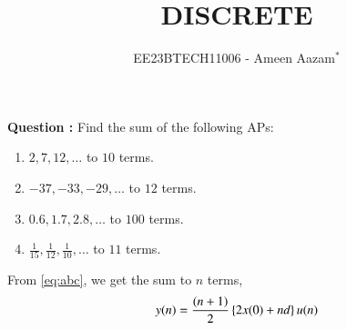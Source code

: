 \documentclass[journal,12pt,twocolumn]{IEEEtran}
\theoremstyle{remark}
\begin{document}

\vspace{3cm}

\title{DISCRETE}
\author{EE23BTECH11006 - Ameen Aazam$^{*}$%
}
\maketitle
\newpage
\bigskip

\renewcommand{\thefigure}{\theenumi}
\renewcommand{\thetable}{\theenumi}

\vspace{3cm}
\textbf{Question :}
Find the sum of the following APs:
\begin{enumerate}[label=(\alph*)]
\item $2, 7, 12, \ldots$ to $10$ terms.
\item $-37, -33, -29, \ldots$ to $12$ terms.
\item $0.6, 1.7, 2.8, \ldots$ to $100$ terms.
\item $\frac{1}{15}, \frac{1}{12}, \frac{1}{10}, \ldots$ to $11$ terms.
\end{enumerate}
\solution

From \eqref{eq:abc}, we get the sum to $n$ terms,
\begin{align}
    y(n)=\frac{(n+1)}{2}\left\{2x(0)+nd\right\}u(n)
\end{align}
\end{document}

